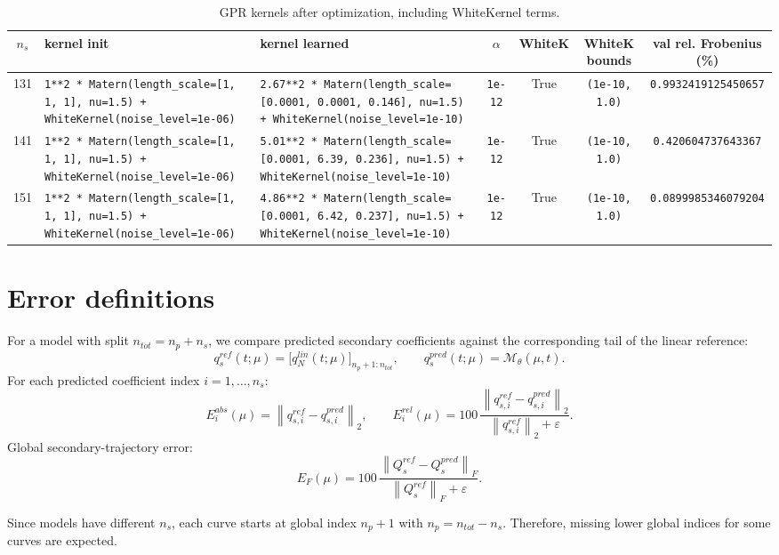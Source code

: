 \documentclass[11pt]{article}
\begin{document}
\begin{table}[H]
\centering
\caption{GPR kernels after optimization, including WhiteKernel terms.}
\scriptsize
\begin{tabular}{cp{}p{}cccc}
\toprule
$n_s$ & kernel init & kernel learned & $\alpha$ & WhiteK & WhiteK bounds & val rel. Frobenius (\%) \\
\midrule
131 & \texttt{1**2 * Matern(length\_scale=[1, 1, 1], nu=1.5) + WhiteKernel(noise\_level=1e-06)} & \texttt{2.67**2 * Matern(length\_scale=[0.0001, 0.0001, 0.146], nu=1.5) + WhiteKernel(noise\_level=1e-10)} & \texttt{1e-12} & True & \texttt{(1e-10, 1.0)} & \texttt{0.9932419125450657} \\
141 & \texttt{1**2 * Matern(length\_scale=[1, 1, 1], nu=1.5) + WhiteKernel(noise\_level=1e-06)} & \texttt{5.01**2 * Matern(length\_scale=[0.0001, 6.39, 0.236], nu=1.5) + WhiteKernel(noise\_level=1e-10)} & \texttt{1e-12} & True & \texttt{(1e-10, 1.0)} & \texttt{0.420604737643367} \\
151 & \texttt{1**2 * Matern(length\_scale=[1, 1, 1], nu=1.5) + WhiteKernel(noise\_level=1e-06)} & \texttt{4.86**2 * Matern(length\_scale=[0.0001, 6.42, 0.237], nu=1.5) + WhiteKernel(noise\_level=1e-10)} & \texttt{1e-12} & True & \texttt{(1e-10, 1.0)} & \texttt{0.0899985346079204} \\
\bottomrule
\end{tabular}
\end{table}


\section*{Error definitions}
For a model with split $n_{tot}=n_p+n_s$, we compare predicted secondary coefficients against the corresponding tail of the linear reference:
\[
q_s^{ref}(t;\mu)=\big[q_N^{lin}(t;\mu)\big]_{n_p+1:n_{tot}},
\qquad
q_s^{pred}(t;\mu)=\mathcal M_{\theta}(\mu,t).
\]
For each predicted coefficient index $i=1,\dots,n_s$:
\[
E_i^{abs}(\mu)=\left\|q_{s,i}^{ref}-q_{s,i}^{pred}\right\|_2,
\qquad
E_i^{rel}(\mu)=100\,
\frac{\left\|q_{s,i}^{ref}-q_{s,i}^{pred}\right\|_2}
{\left\|q_{s,i}^{ref}\right\|_2+\varepsilon}.
\]
Global secondary-trajectory error:
\[
E_F(\mu)=100\,
\frac{\left\|Q_s^{ref}-Q_s^{pred}\right\|_F}
{\left\|Q_s^{ref}\right\|_F+\varepsilon}.
\]

Since models have different $n_s$, each curve starts at global index $n_p+1$ with $n_p=n_{tot}-n_s$.
Therefore, missing lower global indices for some curves are expected.
\end{document}
